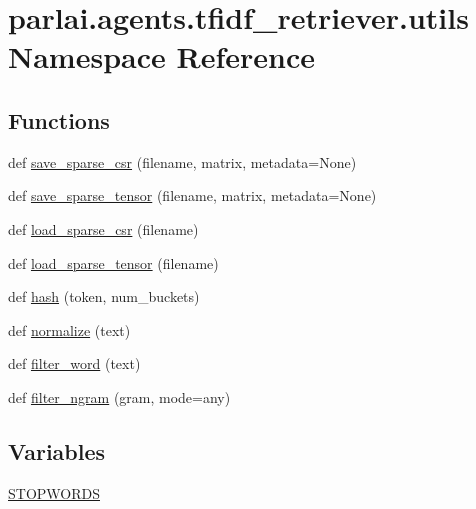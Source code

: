 \hypertarget{namespaceparlai_1_1agents_1_1tfidf__retriever_1_1utils}{}\section{parlai.\+agents.\+tfidf\+\_\+retriever.\+utils Namespace Reference}
\label{namespaceparlai_1_1agents_1_1tfidf__retriever_1_1utils}
\subsection*{Functions}
\begin{DoxyCompactItemize}
\item 
def \hyperlink{namespaceparlai_1_1agents_1_1tfidf__retriever_1_1utils_ad884f6e5806325937ff74a63bc7eea82}{save\+\_\+sparse\+\_\+csr} (filename, matrix, metadata=None)
\item 
def \hyperlink{namespaceparlai_1_1agents_1_1tfidf__retriever_1_1utils_a6d1c2b31f2a5d432d7cb677f436e17c0}{save\+\_\+sparse\+\_\+tensor} (filename, matrix, metadata=None)
\item 
def \hyperlink{namespaceparlai_1_1agents_1_1tfidf__retriever_1_1utils_ac866d85f1378528cb12c8d13b959d279}{load\+\_\+sparse\+\_\+csr} (filename)
\item 
def \hyperlink{namespaceparlai_1_1agents_1_1tfidf__retriever_1_1utils_a28faf0af977db4915cf5253d69d37c0d}{load\+\_\+sparse\+\_\+tensor} (filename)
\item 
def \hyperlink{namespaceparlai_1_1agents_1_1tfidf__retriever_1_1utils_a6df58709964913e04733db89d6e187db}{hash} (token, num\+\_\+buckets)
\item 
def \hyperlink{namespaceparlai_1_1agents_1_1tfidf__retriever_1_1utils_ace97d2139f74e163a7ba81fcfb505f1c}{normalize} (text)
\item 
def \hyperlink{namespaceparlai_1_1agents_1_1tfidf__retriever_1_1utils_a57608b2b9a61223e39e3cb51f5c9f812}{filter\+\_\+word} (text)
\item 
def \hyperlink{namespaceparlai_1_1agents_1_1tfidf__retriever_1_1utils_a791c829884544e127e480a52d233d521}{filter\+\_\+ngram} (gram, mode=\textquotesingle{}any\textquotesingle{})
\end{DoxyCompactItemize}
\subsection*{Variables}
\begin{DoxyCompactItemize}
\item 
\hyperlink{namespaceparlai_1_1agents_1_1tfidf__retriever_1_1utils_a6dcd89ee7dccc9b5dc3ffc8544029c89}{S\+T\+O\+P\+W\+O\+R\+DS}
\end{DoxyCompactItemize}


